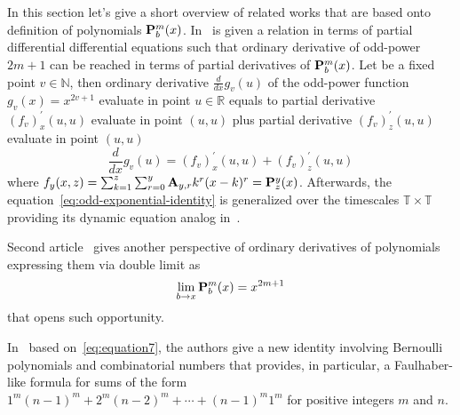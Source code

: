 ﻿In this section let's give a short overview of related works that are based onto definition
of polynomials ${\mathbf{P}}\sp{m} \sb{b}(x)$.
In~\cite{kolosov2023another} is given a relation in terms of partial differential differential equations such that
ordinary derivative of odd-power $2m+1$ can be reached in terms of partial derivatives of ${\mathbf{P}}\sp{m} \sb{b}(x)$.
Let be a fixed point $v\in \mathbb{N}$, then ordinary derivative $\frac{d}{dx} g_v (u)$ of the odd-power function $g_v(x) = x^{2v + 1}$
evaluate in point $u\in\mathbb{R}$ equals to partial derivative $(f_{v})^{'}_{x} (u, u)$ evaluate in point $(u, u)$ plus
partial derivative $(f_{v})^{'}_{z} (u, u)$ evaluate in point $(u, u)$
\begin{equation}
    \frac{d}{dx} g_v (u) = (f_{v})^{'}_{x} (u, u) + (f_{v})^{'}_{z} (u, u)
    \label{eq:odd-exponential-identity}
\end{equation}
where $f_{y} (x, z) = \sum_{k=1}^{z} \sum_{r=0}^{y} {\mathbf{A}} \sb{y,r} k^r (x-k)^r = {\mathbf{P}}\sp{y} \sb{z}(x)$.
Afterwards, the equation~\eqref{eq:odd-exponential-identity}
is generalized over the timescales $\mathbb{T} \times \mathbb{T}$ providing its dynamic equation analog
in~\cite{kolosov2016study}.

Second article~\cite{kolosov_2024_10575485} gives another perspective of ordinary derivatives of polynomials expressing
them via double limit as
\[
    \lim_{b \to x} {\mathbf{P}}\sp{m} \sb{b}(x) = x^{2m+1}
\]
that opens such opportunity.

In~\cite{barbero2020two} based on~\eqref{eq:equation7}, the authors give a new identity involving
Bernoulli polynomials and combinatorial numbers that provides,
in particular, a Faulhaber-like formula for sums of the form $1^m(n-1)^m + 2^m (n -2)^m + \cdots + (n - 1)^m 1^m$ for
positive integers $m$ and $n$.
